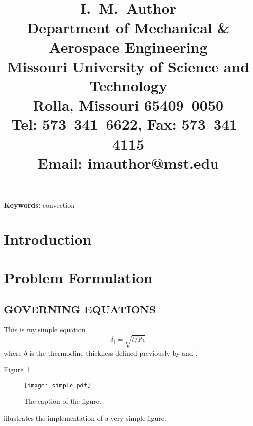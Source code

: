 \documentclass{article}
\newcommand{\ThesisPaperAuthor}[1]{\title{#1}}
\newenvironment{ThesisPaperAbstract}{\begin{abstract}}{\end{abstract}}
\newcommand{\ThesisPaperKeywords}[1]{\textbf{Keywords:} #1}
\begin{document}

\ThesisPaperAuthor{%
 I.\ M.\ Author\\%
 Department of Mechanical \& Aerospace Engineering\\
 Missouri University of Science and Technology\\
 Rolla, Missouri 65409--0050\\
 Tel: 573--341--6622, Fax: 573--341--4115\\
 Email: imauthor@mst.edu%
}




\begin{ThesisPaperAbstract}
\lipsum[52-55]
\end{ThesisPaperAbstract}


\ThesisPaperKeywords{convection}


\section{Introduction}

\lipsum[52-55]


\section{Problem Formulation}

\lipsum[56]
\subsection{GOVERNING EQUATIONS}

This is my simple equation
\begin{equation}
\delta_i = \sqrt{t/\mathrm{Pe}}
\end{equation}
where $\delta$ is the thermocline
thickness %
defined previously by \citep{bullwinkle.1990} and
\citet{winkle.1991}. \lipsum[57-60]

Figure~\ref{fig:fig01} %
\begin{figure}[t]
  \begin{center}
  \texttt{[image: simple.pdf]}
  \end{center}
  \caption{The caption of the figure.}
\label{fig:fig01}
\end{figure}
illustrates the implementation of a very simple figure. \lipsum[61-65]
\end{document}
